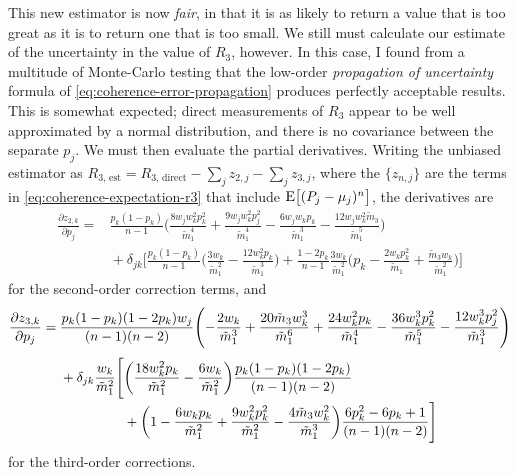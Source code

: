 This new estimator is now \emph{fair}, in that it is as likely to return a value that is too great as it is to return one that is too small.
We still must calculate our estimate of the uncertainty in the value of $R_3$, however.
In this case, I found from a multitude of Monte-Carlo testing that the low-order \emph{propagation of uncertainty} formula of \cref{eq:coherence-error-propagation} produces perfectly acceptable results.
This is somewhat expected; direct measurements of $R_3$ appear to be well approximated by a normal distribution, and there is no covariance between the separate $p_j$.
We must then evaluate the partial derivatives.
Writing the unbiased estimator as $R_{3,\,\text{est}} = R_{3,\,\text{direct}} - \sum_j z_{2,j} - \sum_j z_{3,j}$, where the $\{z_{n,j}\}$ are the terms in \cref{eq:coherence-expectation-r3} that include $\expect[\big]{(P_j - \mu_j)^n}$, the derivatives are
\begin{equation}\begin{aligned}
\frac{\partial z_{2,k}}{\partial p_j} ={}
&\frac{p_k(1-p_k)}{n-1} \Biggl(
   \frac{8w_jw_k^2p_k^2}{\tilde m_1^4}
    + \frac{9w_jw_k^2p_j^2}{\tilde m_1^4}
    - \frac{6w_jw_kp_k}{\tilde m_1^3}
    - \frac{12w_jw_k^2\tilde m_3}{\tilde m_1^5}
\Biggr)\\
&{}+\delta_{jk} \Biggl[
    \frac{p_k(1-p_k)}{n-1}\biggl(
        \frac{3w_k}{\tilde m_1^2} - \frac{12w_k^2p_k}{\tilde m_1^3}
    \biggr)
    + \frac{1-2p_k}{n-1}\frac{3w_k}{\tilde m_1^2}\biggl(
        p_k - \frac{2w_kp_k^2}{\tilde m_1} + \frac{\tilde m_3w_k}{\tilde m_1^2}
    \biggr)
\Biggr]
\end{aligned}\end{equation}
for the second-order correction terms, and
\begin{equation}\begin{alignedat}2
\frac{\partial z_{3,k}}{\partial p_j} = {}
&\frac{p_k(1-p_k)(1-2p_k)w_j}{(n-1)(n-2)} \Biggl(
    - \frac{2w_k}{\tilde m_1^3}
    + \frac{20\tilde m_3w_k^3}{\tilde m_1^6}
    + \frac{24w_k^2p_k}{\tilde m_1^4}
    - \frac{36w_k^3p_k^2}{\tilde m_1^5}
    - \frac{12w_k^3p_j^2}{\tilde m_1^3}
\Biggr)\span\span\\[\jot]
&{}+\delta_{jk} \frac{w_k}{\tilde m_1^2}\Biggl[
    &&\biggl(
        \frac{18w_k^2p_k}{\tilde m_1^2}
        - \frac{6w_k}{\tilde m_1^2}
    \biggr)\frac{p_k(1-p_k)(1-2p_k)}{(n-1)(n-2)}\\[-0.5\jot]
    &&&{}+\biggl(
        1
        - \frac{6w_kp_k}{\tilde m_1^2}
        + \frac{9w_k^2p_k^2}{\tilde m_1^2}
        - \frac{4\tilde m_3w_k^2}{\tilde m_1^3}
    \biggr)\frac{6p_k^2 - 6p_k + 1}{(n-1)(n-2)}
\Biggr]
\end{alignedat}\end{equation}
for the third-order corrections.

